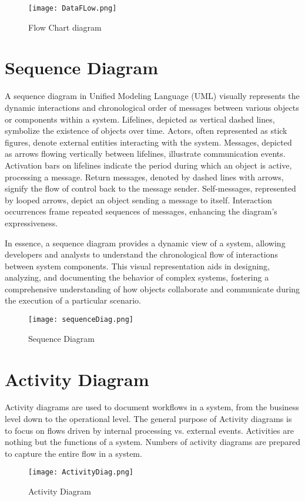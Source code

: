 \documentclass[12pt,a4paper]{report}
\begin{document}
\begin{figure}[ht]
	\begin{center}
		\texttt{[image: DataFLow.png]}
	\end{center}
	\caption{Flow Chart diagram}
\end{figure}
\newpage
\section{Sequence Diagram}
A sequence diagram in Unified Modeling Language (UML) visually represents the dynamic interactions and chronological order of messages between various objects or components within a system. Lifelines, depicted as vertical dashed lines, symbolize the existence of objects over time. Actors, often represented as stick figures, denote external entities interacting with the system. Messages, depicted as arrows flowing vertically between lifelines, illustrate communication events. Activation bars on lifelines indicate the period during which an object is active, processing a message. Return messages, denoted by dashed lines with arrows, signify the flow of control back to the message sender. Self-messages, represented by looped arrows, depict an object sending a message to itself. Interaction occurrences frame repeated sequences of messages, enhancing the diagram's expressiveness.

In essence, a sequence diagram provides a dynamic view of a system, allowing developers and analysts to understand the chronological flow of interactions between system components. This visual representation aids in designing, analyzing, and documenting the behavior of complex systems, fostering a comprehensive understanding of how objects collaborate and communicate during the execution of a particular scenario.

\begin{figure}[ht]
	\begin{center}
		\texttt{[image: sequenceDiag.png]}
	\end{center}
	\caption{Sequence Diagram}
\end{figure}
\newpage
\section{Activity Diagram}
Activity diagrams are used to document workflows in a system, from
the business level down to the operational level. The general purpose
of Activity diagrams is to focus on flows driven by internal processing
vs. external events. Activities are nothing but the functions of a system.
Numbers of activity diagrams are prepared to capture the entire flow in a
system.
\begin{figure}[ht]
	\begin{center}
		\texttt{[image: ActivityDiag.png]}
	\end{center}
	\caption{Activity Diagram}
\end{figure}
\end{document}
